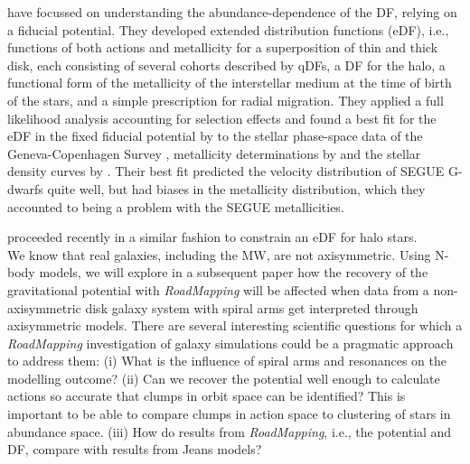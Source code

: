 \documentclass[iop,revtex4,numberedappendix,appendixfloats]{emulateapj}
\newcommand{\RM}{{\sl RoadMapping}}
\begin{document}
\citet{2015MNRAS.449.3479S} have focussed on understanding the abundance-dependence of the DF, relying on a fiducial potential. They developed extended distribution functions (eDF), i.e., functions of both actions and metallicity for a superposition of thin and thick disk, each consisting of several cohorts described by qDFs, a DF for the halo, a functional form of the metallicity of the interstellar medium at the time of birth of the stars, and a simple prescription for radial migration. They applied a full likelihood analysis accounting for selection effects and found a best fit for the eDF in the fixed fiducial potential by \citet{1998MNRAS.294..429D} to the stellar phase-space data of the Geneva-Copenhagen Survey \citep{2004A&A...418..989N,2009A&A...501..941H}, metallicity determinations by \citet{2011A&A...530A.138C} and the stellar density curves by \citet{1983MNRAS.202.1025G}. Their best fit predicted the velocity distribution of SEGUE G-dwarfs \citep{2014ApJS..211...17A} quite well, but had biases in the metallicity distribution, which they accounted to being a problem with the SEGUE metallicities. 

\citet{2016arXiv160309332D} proceeded recently in a similar fashion to constrain an eDF for halo stars.\\

 We know that real galaxies, including the MW, are not axisymmetric. Using N-body models, we will explore in a subsequent paper how the recovery of the gravitational potential with \RM{} will be affected when data from a non-axisymmetric disk galaxy system with spiral arms get interpreted through axisymmetric models. There are several interesting scientific questions for which a \RM{} investigation of galaxy simulations could be a pragmatic approach to address them: (i) What is the influence of spiral arms and resonances on the modelling outcome? (ii) Can we recover the potential well enough to calculate actions so accurate that clumps in orbit space can be identified? This is important to be able to compare clumps in action space to clustering of stars in abundance space. (iii) How do results from \RM{}, i.e., the potential and DF, compare with results from Jeans models?


\end{document}

